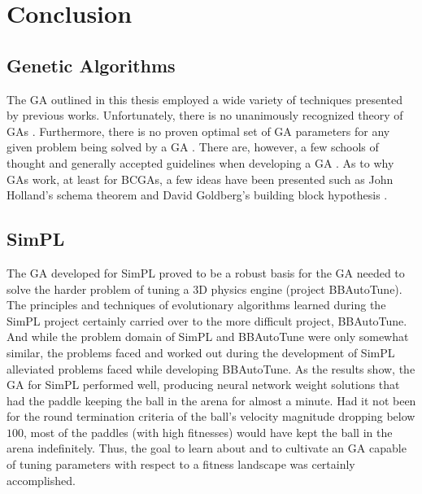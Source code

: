\chapter{Conclusion}

\label{Chapter6}


\section{Genetic Algorithms}

The GA outlined in this thesis employed a wide variety of techniques presented by previous works. Unfortunately, there is no unanimously recognized theory of GAs \cite{Beasley93anoverview}. Furthermore, there is no proven optimal set of GA parameters for any given problem being solved by a GA \cite{ColinReeves}. There are, however, a few schools of thought and generally accepted guidelines when developing a GA \cite{ColinReeves}\cite{Beasley93anoverview}. As to why GAs work, at least for BCGAs, a few ideas have been presented such as John Holland's schema theorem and David Goldberg's building block hypothesis \cite{Beasley93anoverview}. 

\section{SimPL}


The GA developed for SimPL proved to be a robust basis for the GA needed to solve the harder problem of tuning a 3D physics engine (project BBAutoTune). The principles and techniques of evolutionary algorithms learned during the SimPL project certainly carried over to the more difficult project, BBAutoTune. And while the problem domain of SimPL and BBAutoTune were only somewhat similar, the problems faced and worked out during the development of SimPL alleviated problems faced while developing BBAutoTune. As the results show, the GA for SimPL performed well, producing neural network weight solutions that had the paddle keeping the ball in the arena for almost a minute. Had it not been for the round termination criteria of the ball's velocity magnitude dropping below $100$, most of the paddles (with high fitnesses) would have kept the ball in the arena indefinitely. Thus, the goal to learn about and to cultivate an GA capable of tuning parameters with respect to a fitness landscape was certainly accomplished. 

